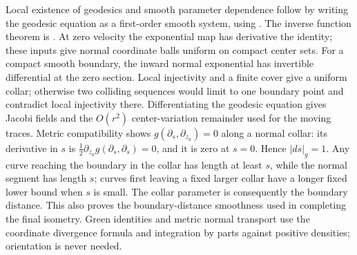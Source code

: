 Local existence of geodesics and smooth parameter dependence follow by
writing the geodesic equation as a first-order smooth system, using
\citep[Theorem~2.1, Propositions~6.1--6.2]{TaylorODE}.
The inverse function theorem is \citep[Theorem~3.1]{TaylorODE}.
At zero velocity the exponential map has derivative the identity;
these inputs give normal coordinate balls uniform on compact center sets.
For a compact smooth boundary, the inward normal exponential has
invertible differential at the zero section. Local injectivity and a
finite cover give a uniform collar; otherwise two colliding sequences
would limit to one boundary point and contradict local injectivity there.
Differentiating the geodesic equation gives Jacobi fields and the
$O(r^2)$ center-variation remainder used for the moving traces.
Metric compatibility shows $g(\partial_s,\partial_{z_a})=0$ along a
normal collar: its derivative in $s$ is
$\frac12\partial_{z_a}g(\partial_s,\partial_s)=0$, and it is zero at
$s=0$. Hence $|ds|_g=1$. Any curve reaching the boundary in the collar
has length at least $s$, while the normal segment has length $s$;
curves first leaving a fixed larger collar have a longer fixed lower
bound when $s$ is small. The collar parameter is consequently the
boundary distance. This also proves the boundary-distance smoothness
used in completing the final isometry. Green identities and metric
normal transport use the coordinate divergence formula and integration
by parts against positive densities; orientation is never needed.
